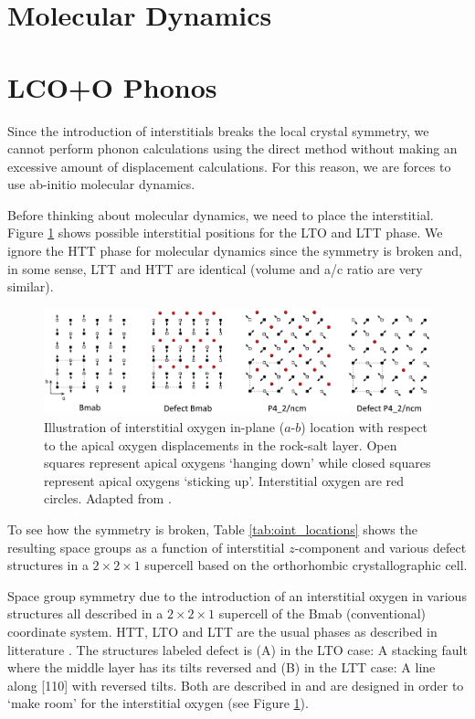 \section{Molecular Dynamics}

\section{LCO+O Phonos}
Since the introduction of interstitials breaks the local crystal symmetry, we cannot perform phonon calculations using the direct method without making an excessive amount of displacement calculations. For this reason, we are forces to use ab-initio molecular dynamics.

Before thinking about molecular dynamics, we need to place the interstitial. Figure \ref{fig:oint_location} shows possible interstitial positions for the LTO and LTT phase. We ignore the HTT phase for molecular dynamics since the symmetry is broken and, in some sense, LTT and HTT are identical (volume and a/c ratio are very similar).



\begin{figure}
    \centering
    \includegraphics[width=\textwidth]{fig/simulation/oint.png}
    \caption[Illustration of interstitial positions]{Illustration of interstitial oxygen in-plane ($a$-$b$) location with respect to the apical oxygen displacements in the rock-salt layer. Open squares represent apical oxygens `hanging down' while closed squares represent apical oxygens `sticking up'. Interstitial oxygen are red circles. Adapted from \cite{Tranquada1995}.}
    \label{fig:oint_location}
\end{figure}

To see how the symmetry is broken, Table \ref{tab:oint_locations} shows the resulting space groups as a function of interstitial $z$-component and various defect structures in a $2 \times 2 \times 1$ supercell based on the orthorhombic crystallographic cell. 

\begin{table}[b]
    \centering
    
    \caption[Oxygen interstitial phases]{Space group symmetry due to the introduction of an interstitial oxygen in various structures all described in a $2 \times 2 \times 1$ supercell of the Bmab (conventional) coordinate system. HTT, LTO and LTT are the usual phases as described in litterature \cite{Hucker2012}. The structures labeled defect is (A) in the LTO case: A stacking fault where the middle layer has its tilts reversed and (B) in the LTT case: A line along [110] with reversed tilts. Both are described in \cite{Tranquada1994} and are designed in order to `make room' for the interstitial oxygen (see Figure \ref{fig:oint_location}).}
    \label{tab:oint_locations}
\end{table}

